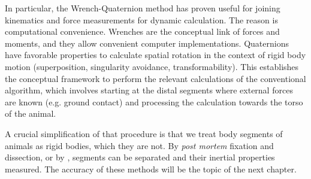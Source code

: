 In particular, the Wrench-Quaternion method \citep{Dumas2004} has proven useful for joining kinematics and force measurements for dynamic calculation.
The reason is computational convenience.
Wrenches are the conceptual link of forces and moments, and they allow convenient computer implementations.
Quaternions have favorable properties to calculate spatial rotation in the context of rigid body motion (superposition, singularity avoidance, transformability).
This establishes the conceptual framework to perform the relevant calculations of the conventional algorithm, which involves starting at the distal segments where external forces are known (e.g. ground contact) and processing the calculation towards the torso of the animal.


A crucial simplification of that procedure is that we treat body segments of animals as rigid bodies, which they are not.
By \emph{post mortem} fixation and dissection, or by , segments can be separated and their inertial properties measured.
The accuracy of these methods will be the topic of the next chapter.
